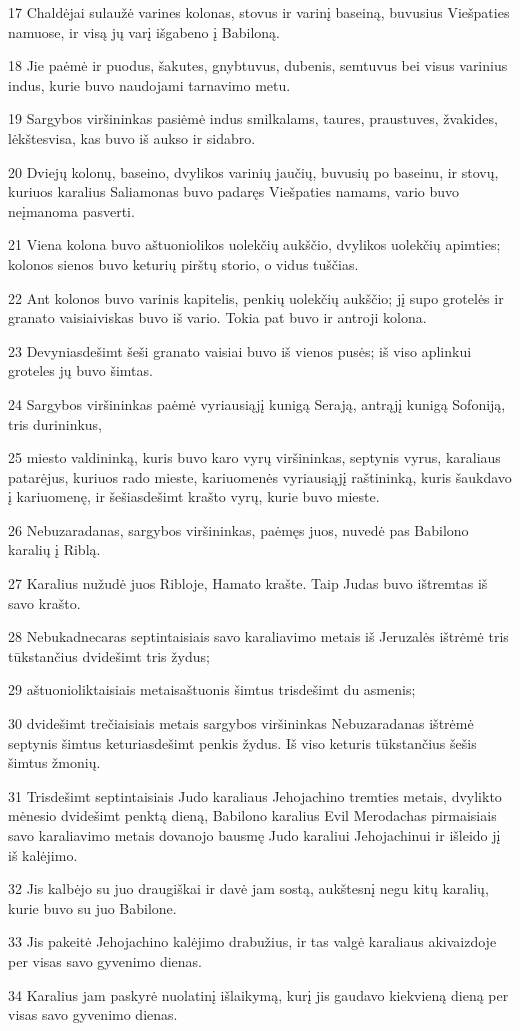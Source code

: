 \par 17 Chaldėjai sulaužė varines kolonas, stovus ir varinį baseiną, buvusius Viešpaties namuose, ir visą jų varį išgabeno į Babiloną. 
\par 18 Jie paėmė ir puodus, šakutes, gnybtuvus, dubenis, semtuvus bei visus varinius indus, kurie buvo naudojami tarnavimo metu. 
\par 19 Sargybos viršininkas pasiėmė indus smilkalams, taures, praustuves, žvakides, lėkštes­visa, kas buvo iš aukso ir sidabro. 
\par 20 Dviejų kolonų, baseino, dvylikos varinių jaučių, buvusių po baseinu, ir stovų, kuriuos karalius Saliamonas buvo padaręs Viešpaties namams, vario buvo neįmanoma pasverti. 
\par 21 Viena kolona buvo aštuoniolikos uolekčių aukščio, dvylikos uolekčių apimties; kolonos sienos buvo keturių pirštų storio, o vidus tuščias. 
\par 22 Ant kolonos buvo varinis kapitelis, penkių uolekčių aukščio; jį supo grotelės ir granato vaisiai­viskas buvo iš vario. Tokia pat buvo ir antroji kolona. 
\par 23 Devyniasdešimt šeši granato vaisiai buvo iš vienos pusės; iš viso aplinkui groteles jų buvo šimtas. 
\par 24 Sargybos viršininkas paėmė vyriausiąjį kunigą Serają, antrąjį kunigą Sofoniją, tris durininkus, 
\par 25 miesto valdininką, kuris buvo karo vyrų viršininkas, septynis vyrus, karaliaus patarėjus, kuriuos rado mieste, kariuomenės vyriausiąjį raštininką, kuris šaukdavo į kariuomenę, ir šešiasdešimt krašto vyrų, kurie buvo mieste. 
\par 26 Nebuzaradanas, sargybos viršininkas, paėmęs juos, nuvedė pas Babilono karalių į Riblą. 
\par 27 Karalius nužudė juos Ribloje, Hamato krašte. Taip Judas buvo ištremtas iš savo krašto. 
\par 28 Nebukadnecaras septintaisiais savo karaliavimo metais iš Jeruzalės ištrėmė tris tūkstančius dvidešimt tris žydus; 
\par 29 aštuonioliktaisiais metais­aštuonis šimtus trisdešimt du asmenis; 
\par 30 dvidešimt trečiaisiais metais sargybos viršininkas Nebuzaradanas ištrėmė septynis šimtus keturiasdešimt penkis žydus. Iš viso keturis tūkstančius šešis šimtus žmonių. 
\par 31 Trisdešimt septintaisiais Judo karaliaus Jehojachino tremties metais, dvylikto mėnesio dvidešimt penktą dieną, Babilono karalius Evil Merodachas pirmaisiais savo karaliavimo metais dovanojo bausmę Judo karaliui Jehojachinui ir išleido jį iš kalėjimo. 
\par 32 Jis kalbėjo su juo draugiškai ir davė jam sostą, aukštesnį negu kitų karalių, kurie buvo su juo Babilone. 
\par 33 Jis pakeitė Jehojachino kalėjimo drabužius, ir tas valgė karaliaus akivaizdoje per visas savo gyvenimo dienas. 
\par 34 Karalius jam paskyrė nuolatinį išlaikymą, kurį jis gaudavo kiekvieną dieną per visas savo gyvenimo dienas.



